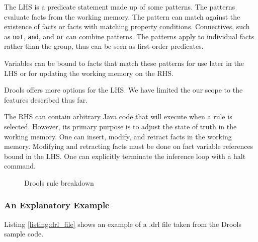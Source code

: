 The LHS is a predicate statement made up of some patterns.
The patterns evaluate facts from the working memory.
The pattern can match against the existence of facts or facts with matching property conditions.
Connectives, such as \texttt{not}, \texttt{and}, and \texttt{or} can combine patterns.
The patterns apply to individual facts rather than the group, thus can be seen as first-order predicates.

Variables can be bound to facts that match these patterns for use later in the LHS or for updating the working memory on the RHS.

Drools offers more options for the LHS.
We have limited the our scope to the features described thus far.

The RHS can contain arbitrary Java code that will execute when a rule is selected.
However, its primary purpose is to adjust the state of truth in the working memory.
One can insert, modify, and retract facts in the working memory.
Modifying and retracting facts must be done on fact variable references bound in the LHS.
One can explicitly terminate the inference loop with a halt command.

\begin{figure}
    \centering
    \caption{Drools rule breakdown}
    \label{fig:Drools_Rule_Breakdown}
\end{figure}

\subsubsection{An Explanatory Example}
Listing \ref{listing:drl_file} shows an example of a .drl file taken from the Drools sample code.

